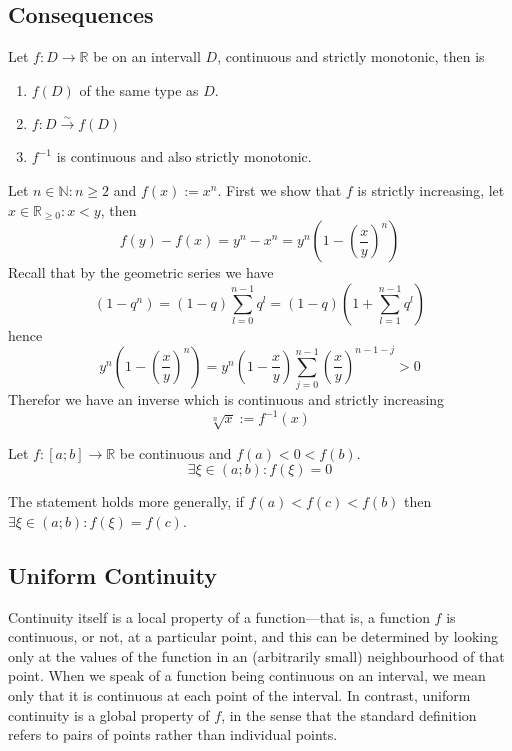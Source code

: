 \subsection{Consequences}
\begin{theorem}
   Let \(f: D \to \mathbb{R}\) be on an intervall \(D\), continuous and strictly monotonic, then is
   \begin{enumerate}[label=\roman*, align=Center]
      \item \(f(D)\) of the same type as \(D\).
      \item \(f:D \xrightarrow{\sim} f(D)\)
      \item \(f^{-1}\) is continuous and also strictly monotonic.
   \end{enumerate}
\end{theorem}
\begin{example}
   Let \(n \in \mathbb{N}: n \geq 2\) and \(f(x) := x^n\).
   First we show that \(f\) is strictly increasing, let \(x \in \mathbb{R}_{\geq 0}: x < y\), then
   \[f(y) - f(x) = y^n - x^n = y^n \left(1 - \left(\frac{x}{y}\right)^n\right)\]
   Recall that by the geometric series we have
   \[(1- q^n) = (1-q) \sum_{l=0}^{n-1} q^l = (1-q)\left(1 + \sum_{l=1}^{n-1} q^l\right)\]
   hence
   \[y^n \left(1 - \left(\frac{x}{y}\right)^n\right) = y^n \left(1 - \frac{x}{y}\right) \sum_{j=0}^{n-1} \left(\frac{x}{y}\right)^{n-1-j} > 0\]
   Therefor we have an inverse which is continuous and strictly increasing
   \[\sqrt[n]{x} := f^{-1}(x)\]
\end{example}

\begin{theorem}\label{thm:intmd_value}
   Let \(f: [a; b] \to \mathbb{R}\) be continuous and \(f(a) < 0 < f(b)\).
   \[\exists \xi \in (a;b): f(\xi) = 0\]
\end{theorem}
\begin{remark}[Tips]
   The statement holds more generally, if \(f(a) < f(c) < f(b)\) then \(\exists \xi \in (a;b): f(\xi) = f(c)\).
\end{remark}

\subsection{Uniform Continuity}
Continuity itself is a local property of a function—that is, a function \(f\) is continuous, or not, at a particular point, and this can be determined by looking only at the values of the function in an (arbitrarily small) neighbourhood of that point.
When we speak of a function being continuous on an interval, we mean only that it is continuous at each point of the interval.
In contrast, uniform continuity is a global property of \(f\), in the sense that the standard definition refers to pairs of points rather than individual points.

